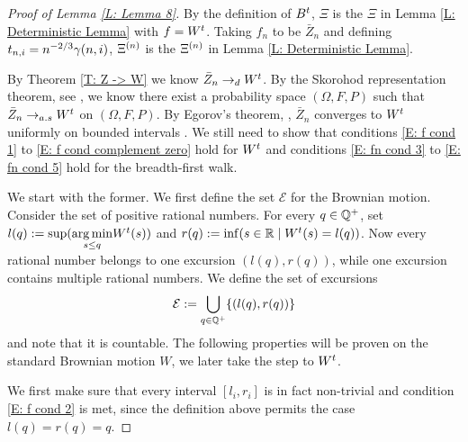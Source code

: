\begin{proof}[Proof of Lemma \ref{L: Lemma 8}]
	By the definition of $B^t$, 
	$\Xi$ is the $\Xi$ in Lemma \ref{L: Deterministic Lemma} with $f = W^t$.
	Taking $f_n$ to be $\bar{Z}_n$ and defining $t_{n, i} = n^{-2 / 3} \gamma(n,i)$,
	$\Xi^{(n)}$ is the $\Xi^{(n)}$ in Lemma \ref{L: Deterministic Lemma}.
	
	By Theorem \ref{T: Z -> W} we know $\bar{Z}_n \rightarrow_d W^t$.
	By the Skorohod representation theorem,
	see \cite{Billingsley2009}, 
	we know there exist a probability space $(\Omega, F, P)$ such that
	$\bar{Z}_n \rightarrow_{a.s} W^t$ on $(\Omega, F, P)$.
	By Egorov's theorem, \cite{Someting},
	$\bar{Z}_n$ converges to $W^t$ uniformly on bounded intervals .
	We still need to show that conditions \eqref{E: f cond 1} to \eqref{E: f cond complement zero} hold for $W^t$
	and conditions \eqref{E: fn cond 3} to \eqref{E: fn cond 5} hold for the breadth-first walk.
	
	
	We start with the former. 
	We first define the set $\mathcal{E}$ for the Brownian motion.
	Consider the set of positive rational numbers.
	For every $q \in \mathbb{Q}^+$, 
	set $l(q) := \sup( \underset{s \leq q}{\operatorname*{arg\,min}} W^t(s) ) $ 
	and $r(q) := \inf( {s \in \mathbb{R} \; | \; W^t(s) = l(q)} ) $.
	Now every rational number belongs to one excursion $(l(q), r(q))$,
	while one excursion contains multiple rational numbers.
	We define the set of excursions
	\begin{equation}
	\mathcal{E} := \bigcup_{q \in \mathbb{Q}^+} \{ (l(q), r(q)) \}
	\end{equation}
	and note that it is countable.
	The following properties will be proven on the standard Brownian motion $W$,
	we later take the step to $W^t$.
	
	We first make sure that every interval $[l_i, r_i]$ is in fact non-trivial and condition \ref{E: f cond 2} is met,
	since the definition above permits the case $l(q) = r(q) = q$.
	

\end{proof}
